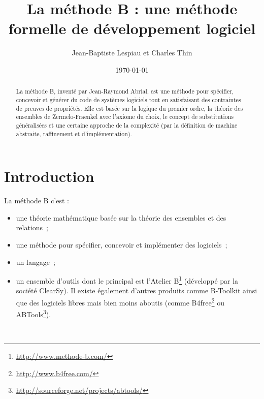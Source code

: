 \documentclass[10pt,a4paper]{article}
\author{Jean-Baptiste Lespiau et Charles Thin}
\title{La méthode B : une méthode formelle de développement logiciel}
\date\today
\begin{document}
\maketitle

\begingroup
\hypersetup{hidelinks}
\tableofcontents
\endgroup


\newpage

\begin{abstract}
La méthode B, inventé par Jean-Raymond Abrial, est une méthode pour spécifier, concevoir et générer du code de systèmes logiciels tout en satisfaisant des contraintes de preuves de propriétés.
Elle est basée sur la logique du premier ordre, la théorie des ensembles de Zermelo-Fraenkel avec l'axiome du choix, le concept de substitutions généralisées et une certaine approche de la complexité (par la définition de machine abstraite, raffinement et d'implémentation).
\end{abstract}

\section{Introduction}

La méthode B c'est :
\begin{itemize}
\item une théorie mathématique basée sur la théorie des ensembles et des relations~;
\item une méthode pour spécifier, concevoir et implémenter des logiciels~;
\item un langage~;
\item un ensemble d'outils dont le principal est l'Atelier B\footnote{\url{http://www.methode-b.com/}} (développé par la société ClearSy). Il existe également d'autres produits comme B-Toolkit ainsi que des logiciels libres mais bien moins aboutis (comme B4free\footnote{\url{http://www.b4free.com/}} ou ABTools\footnote{\url{http://sourceforge.net/projects/abtools/}}).
\end{itemize}
~
\end{document}
